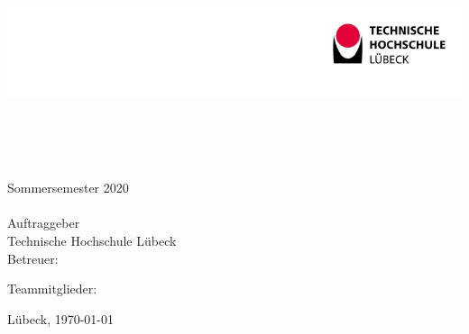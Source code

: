 



\begin{titlepage}


\includegraphics[width=\textwidth]{titlepage/thl_logo.png}


\vspace*{-2.8cm}


~\\[5ex]

\begin{center}

{}\\[5ex]

{}\\[5ex]

Sommersemester 2020\\[6ex]

{}\\[5ex]

Auftraggeber\\
Technische Hochschule Lübeck\\

Betreuer: \betreuer\\[5ex]

\vspace*{2.8cm}

Teammitglieder:\\


\vspace*{2.0cm}

\vfill
Lübeck, \today

\end{center}
\end{titlepage}

